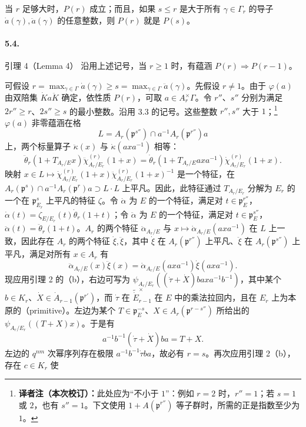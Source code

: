 当 $r$ 足够大时，$P(r)$ 成立；而且，如果 $s\leq r$ 是大于所有 $\gamma\in\Gamma_r$ 的导子 $\dot a(\gamma),\ddot a(\gamma)$ 的任意整数，则 $P(r)$ 就是 $P(s)$。
\paragraph*{5.4.}
\begin{originaltheorem}{引理 4（Lemma 4）}
沿用上述记号，当 $r\geq1$ 时，有蕴涵 $P(r)\Rightarrow P(r-1)$。
\end{originaltheorem}
可假设 $r=\max_{\gamma\in\Gamma}\dot a(\gamma)\geq s=\max_{\gamma\in\Gamma}\ddot a(\gamma)$。先假设 $r\ne1$。由于 $\varphi(a)$ 由双陪集 $\dot Ka\ddot K$ 确定，依性质 $P(r)$，可取 $a\in A_r^\times\Gamma$。令 $r''$、$s''$ 分别为满足 $2r''\geq r$、$2s''\geq s$ 的最小整数。沿用 3.3 的记号。这些整数 $r'',s''$ 大于 $1$；\footnote{\textbf{译者注（本次校订）：}此处应为“不小于 $1$”：例如 $r=2$ 时，$r''=1$；若 $s=1$ 或 $2$，也有 $s''=1$。下文使用 $1+A(\mathfrak p^{r''})$ 等子群时，所需的正是指数至少为 $1$。}$\varphi(a)$ 非零蕴涵在格
\[
L=A_r(\mathfrak p^{s''})\cap a^{-1}A_r(\mathfrak p^{r''})a
\]
上，两个标量算子 $\ddot\kappa(x)$ 与 $\dot\kappa(axa^{-1})$ 相等：
\[
\ddot\theta_r(1+T_{A_r/E}x)\ddot\chi_{A_r/E_r}^{(r)}(1+x)
=\dot\theta_r(1+T_{A_r/E}axa^{-1})\dot\chi_{A_r/E_r}^{(r)}(1+x).
\]
映射 $x\in L\mapsto\dot\chi_{A_r/E_r}^{(r)}(1+x)\ddot\chi_{A_r/E_r}^{(r)}(1+x)^{-1}$ 是一个特征，在 $A_r(\mathfrak p^s)\cap a^{-1}A_r(\mathfrak p^r)a\supset L\cdot L$ 上平凡。因此，此特征通过 $T_{A_r/E_r}$ 分解为 $E_r$ 的一个在 $\mathfrak p_{E_r}^s$ 上平凡的特征 $\zeta$。令 $\dot\alpha$ 为 $E$ 的一个特征，满足对 $t\in\mathfrak p_E^{r''}$，$\dot\alpha(t)=\zeta_{E/E_r}(t)\dot\theta_r(1+t)$；令 $\ddot\alpha$ 为 $E$ 的一个特征，满足对 $t\in\mathfrak p_E^{s''}$，$\ddot\alpha(t)=\ddot\theta_r(1+t)$。$A_r$ 的两个特征 $\ddot\alpha_{A_r/E}$ 与 $x\mapsto\dot\alpha_{A_r/E}(axa^{-1})$ 在 $L$ 上一致，因此存在 $A_r$ 的两个特征 $\dot\xi,\ddot\xi$，其中 $\dot\xi$ 在 $A_r(\mathfrak p^{r''})$ 上平凡、$\ddot\xi$ 在 $A_r(\mathfrak p^{s''})$ 上平凡，满足对所有 $x\in A_r$ 有
\[
\ddot\alpha_{A_r/E}(x)\ddot\xi(x)=\dot\alpha_{A_r/E}(axa^{-1})\dot\xi(axa^{-1}).
\]
现应用引理 2 的（b），右边可写为 $\psi_{A_r/E_r}((\dot\tau+\dot X)baxa^{-1}b^{-1})$，其中某个 $b\in K_r$、$\dot X\in\dot A_{r-1}(\mathfrak p^{r'})$，而 $\dot\tau$ 在 $\widetilde{\dot E}_{r-1}^\times$ 在 $E$ 中的乘法拉回内，且在 $E_r$ 上为本原的（primitive）。左边为某个 $T\in\mathfrak p_E^{-s}$、$X\in A_r(\mathfrak p^{r-s''})$ 所给出的 $\psi_{A_r/E_r}((T+X)x)$。于是有
\[
a^{-1}b^{-1}(\dot\tau+\dot X)ba=T+X.
\]
左边的 $q^{nm}$ 次幂序列存在极限 $a^{-1}b^{-1}\dot\tau ba$，故必有 $r=s$。再次应用引理 2（b），存在 $c\in K_r$ 使
